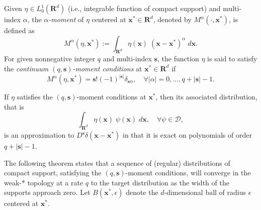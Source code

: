 %
Given $\eta\in L^1_0(\mathbf R^d)$ (i.e., integrable function of compact support) and multi-index $\alpha$, the {\em $\alpha$-moment} of $\eta$ centered at $\mathbf x^*\in\mathbf R^d$, denoted by $M^\alpha(\cdot,\mathbf x^*)$, is defined as
\begin{equation}\label{eq:def_mom}
	M^\alpha(\eta,\mathbf x^*) := \int_{\mathbf R^d} \eta(\mathbf x) \; (\mathbf x-\mathbf x^*)^{\alpha} \; d\mathbf x.
\end{equation}
For given nonnegative integer $q$ and multi-index $\mathbf s$, the function $\eta$ is said to satisfy the {\em continuum $(q,\mathbf s)$-moment conditions} at $\mathbf x^*\in \mathbf R^d$ if
\begin{equation}\label{eq:momcond}
	M^\alpha(\eta,\mathbf x^*) = \mathbf s! (-1)^{|\mathbf s|} \delta_{\mathbf s \alpha}, \quad \forall |\alpha|=0,...,q+|\mathbf s|-1.
\end{equation}

If $\eta$ satisfies the $(q,\mathbf s)$-moment conditions at $\mathbf x^*$, then its associated distribution, that is
\[
	\int_{\mathbf R^d} \eta(\mathbf x) \; \psi(\mathbf x)\; d\mathbf x, \quad \forall \psi\in\mathcal D,
\]	
is an approximation to $D^{\mathbf s}\delta(\mathbf x-\mathbf x^*)$ in that it is exact on polynomials of order $q+|\mathbf s|-1$.

The following theorem states that a sequence of (regular) distributions of compact support, satisfying the $(q,\mathbf s)$-moment conditions, will converge in the weak-$*$ topology at a rate $q$ to the target distribution as the width of the supports approach zero. 
Let $B(\mathbf x^*,\epsilon)$ denote the $d$-dimensional ball of radius $\epsilon$ centered at $\mathbf x^*$.

